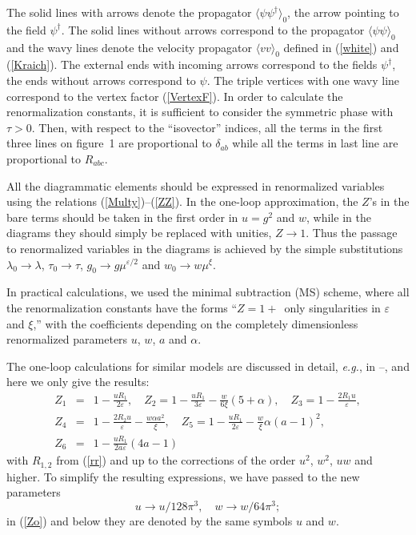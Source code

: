 \documentclass[12pt]{iopart}
\begin{document}



The solid lines with arrows denote the propagator $\langle \psi \psi^{\dag}
\rangle_{0}$, the arrow pointing to the field $\psi^{\dag}$. The solid lines
without arrows correspond to the propagator $\langle \psi \psi \rangle_{0}$
and the wavy lines denote the velocity propagator $\langle vv \rangle_{0}$
defined in (\ref{white}) and (\ref{Kraich}). The external ends with incoming
arrows correspond to the fields $\psi^{\dag}$, the ends without arrows
correspond to $\psi$. The triple vertices with one wavy line correspond to
the vertex factor (\ref{VertexF}). In order to calculate the renormalization
constants, it is sufficient to consider the symmetric phase with $\tau>0$.
Then, with respect to the ``isovector'' indices, all the terms in the first
three lines on figure~1 are proportional to $\delta_{ab}$ while all the
terms in last line are proportional to $R_{abc}$.

All the diagrammatic elements should be expressed in renormalized
variables using the relations (\ref{Multy})--(\ref{ZZ}). In the
one-loop approximation, the $Z$'s in the bare terms should be
taken in the first order in $u= g^{2}$
and $w$, while in the diagrams they should simply be replaced with
unities, $Z \to 1$. Thus the passage to renormalized variables
in the diagrams is achieved by the simple substitutions
$\lambda_{0} \to \lambda$, $\tau_{0} \to \tau$, $g_{0} \to
g\mu^{\varepsilon/2}$ and $w_{0} \to w\mu^{\xi}$.

In practical calculations, we used the minimal subtraction (MS) scheme,
where all the renormalization constants have the forms
``$Z=1+\,$ only singularities in $\varepsilon$ and $\xi$,'' with
the coefficients depending on the completely dimensionless
renormalized parameters $u$, $w$, $a$ and $\alpha$.

The one-loop calculations for similar models are discussed in detail,
{\it e.g.}, in \cite{AHH}--\cite{AK}, and here we only give the results:
\begin{eqnarray}
Z_{1} &=& 1 - \frac{uR_{1}}{2\varepsilon}, \quad
Z_{2} = 1 - \frac{uR_{1}}{3\varepsilon} - \frac{w}{6\xi}(5+\alpha), \quad
Z_{3} = 1 - \frac{2R_{1}u}{\varepsilon},
\nonumber \\
Z_{4} &=& 1 - \frac{2R_{2}u}{\varepsilon} - \frac{w \alpha a^2}{\xi}, \quad
Z_{5} = 1 - \frac{uR_{1}}{2\varepsilon} - \frac{w}{\xi} \alpha (a-1)^{2},
\nonumber \\
Z_{6} &=& 1 - \frac{uR_{1}}{ 2a\varepsilon}(4a-1)
\label{Zo}
\end{eqnarray}
with $R_{1,2}$ from (\ref{rr}) and up to the corrections of the order
$u^{2}$, $w^{2}$, $uw$ and higher. To simplify the resulting expressions,
we have passed to the new parameters
\[ u \to u/128\pi^3, \quad w \to w/64\pi^3; \]
in (\ref{Zo}) and below they are denoted by the same symbols $u$ and $w$.
\end{document}
